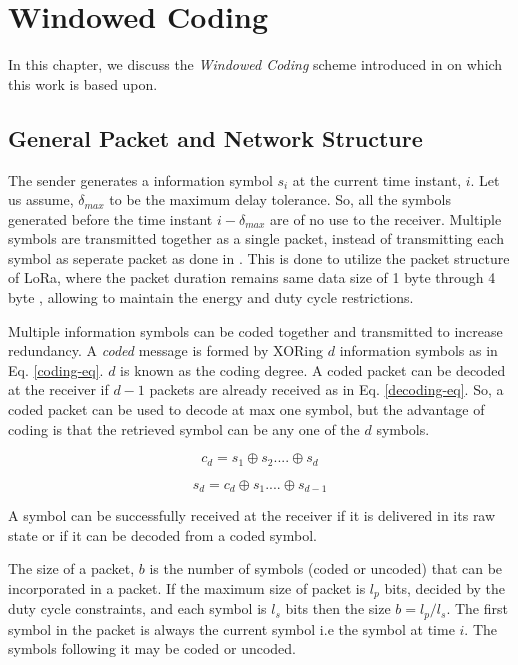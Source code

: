 \chapter{Windowed Coding}
\label{chap-2}
\graphicspath{{Chapter_2/Vector/}{Chapter_2/}}

In this chapter, we discuss the \textit{Windowed Coding} scheme introduced in \cite{borkotokyicc} on which this work is based upon.

\section{General Packet and Network Structure}
The sender generates a information symbol $s_i$ at the current time instant, $i$. Let us assume, $\delta_{max}$ to be the maximum delay tolerance. So, all the symbols generated before the time instant $i - \delta_{max}$ are of no use to the receiver. Multiple symbols are transmitted together as a single packet, instead of transmitting each symbol as seperate packet as done in \cite{DRINEA2013100, Fong}. This is done to utilize the packet structure of LoRa, where the packet duration remains same data size of 1 byte through 4 byte \cite{lora}, allowing to maintain the energy and duty cycle restrictions.

Multiple information symbols can be coded together and transmitted to increase redundancy. A \textit{coded} message is formed by XORing $d$ information symbols as in Eq. \ref{coding-eq}. $d$ is known as the coding degree. A coded packet can be decoded at the receiver if $d-1$ packets are already received as in Eq. \ref{decoding-eq}. So, a coded packet can be used to decode at max one symbol, but the advantage of coding is that the retrieved symbol can be any one of the $d$ symbols. 

\begin{equation}
c_d = s_1 \oplus s_2 .... \oplus s_d
\label{coding-eq}
\end{equation}

\begin{equation}
	s_d = c_d \oplus s_1 .... \oplus s_{d-1}
	\label{decoding-eq}
\end{equation}

A symbol can be successfully received at the receiver if it is delivered in its raw state or if it can be decoded from a coded symbol.

The size of a packet, $b$ is the number of symbols (coded or uncoded) that can be incorporated in a packet. If the maximum size of packet is $l_p$ bits, decided by the duty cycle constraints, and each symbol is $l_s$ bits then the size $b = l_p/l_s$. The first symbol in the packet is always the current symbol i.e the symbol at time $i$. The symbols following it may be coded or uncoded.
\\

